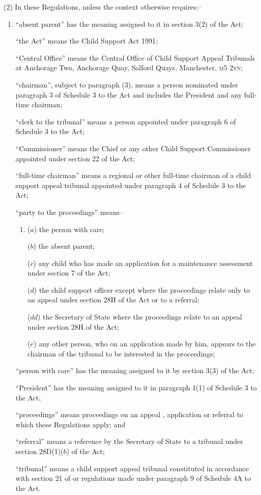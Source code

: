 \documentclass[12pt,a4paper]{article}
\begin{document}
(2) In these Regulations, unless the context otherwise requires:–
\begin{enumerate}\item[]
“absent parent” has the meaning assigned to it in section 3(2) of the Act;

“the Act” means the Child Support Act 1991;

“Central Office” means the Central Office of Child Support Appeal Tribunals at Anchorage Two, Anchorage Quay, Salford Quays, Manchester, \textsc{m5 2yn};

“chairman”, subject to paragraph (3), means a person nominated under paragraph 3 of Schedule 3 to the Act and includes the President and any full-time chairman;

“clerk to the tribunal” means a person appointed under paragraph 6 of Schedule 3 to the Act;

“Commissioner” means the Chief or any other Child Support Commissioner appointed under section 22 of the Act;

“full-time chairman” means a regional or other full-time chairman of a child support appeal tribunal appointed under paragraph 4 of Schedule 3 to the Act;

“party to the proceedings” means–
\begin{enumerate}\item[]
($a$) the person with care;

($b$) the absent parent;

($c$) any child who has made an application for a maintenance assessment under section 7 of the Act;

($d$) the child support officer
except where the proceedings relate only to an appeal under section 28H
of the Act or to a referral;  %

($dd$) the Secretary of State where the proceedings relate to an appeal under
section 28H of the Act;

($e$) any other person, who on an application made by him, appears to the chairman of the tribunal to be interested in the proceedings;
\end{enumerate}

“person with care” has the meaning assigned to it by section 3(3) of the Act;

“President” has the meaning assigned to it in paragraph 1(1) of Schedule 3 to the Act;

“proceedings” means proceedings on an appeal%
, application or referral  %
to which these Regulations apply; and

“referral” means a reference by the Secretary of State to a tribunal under
section 28D(1)($b$) of the Act;

“tribunal” means a child support appeal tribunal constituted in accordance with section 21 of 
or regulations made under paragraph 9 of Schedule 4A
to  %
the Act.
\end{enumerate}
\end{document}
